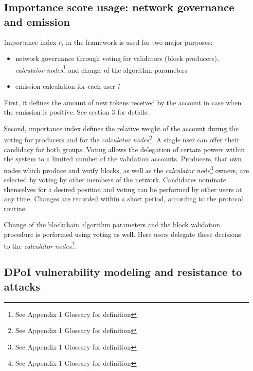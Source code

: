 \documentclass[a4paper,12pt]{article}
\begin{document}
\subsection{Importance score usage: network governance and emission}

Importance index $r_i$ in the framework is used for two major purposes:
\begin{itemize}
\item  network governance through voting for validators (block producers), \emph{calculator nodes}\footnote{See Appendix 1 Glossary for definition} and change of the algorithm parameters
\item emission calculation for each user \textit{i}
\end{itemize}


First, it defines the amount of new tokens received by the account in case when the emission is positive.  See section 3 for details.

Second, importance index defines the relative weight of the account during the voting for producers and for the \emph{calculator nodes}\footnote{See Appendix 1 Glossary for definition}. A single user can offer their candidacy for both groups. Voting allows the delegation of certain powers within the system to a limited number of the validation accounts. Producers, that own nodes which produce and verify blocks, as well as the \emph{calculator node}\footnote{See Appendix 1 Glossary for definition} owners, are selected by voting by other members of the network. Candidates nominate themselves for a desired position and voting can be performed by other users at any time. Changes are recorded within a short period, according to the protocol routine.

Change of the blockchain algorithm parameters and the block validation procedure is performed using voting as well. Here users delegate these decisions to the \emph{calculator nodes}\footnote{See Appendix 1 Glossary for definition}.





\subsection{DPoI vulnerability modeling and resistance to attacks}
\end{document}
